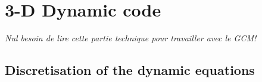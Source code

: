 \chapter{3-D Dynamic code}
\label{sc:dynamic}
{\it\bg  Nul besoin de lire cette partie technique pour travailler avec le GCM!}
\section{Discretisation of the dynamic equations}


\newcommand{\deriv}[1]{\frac{\partial }{\partial #1} }
\def\abs#1{\left| #1 \right|}
\renewcommand{\-}[1]{$^{-#1}$}

\newcommand{\dt}[1]{\frac{\partial #1}{\partial t}}
\newcommand{\dsig}[1]{\deriv{\sigma} \dep{#1} }
\newcommand{\diverg}[1]{\vec{\nabla}.\dep{#1 \vec{V}} }
\def\ps{p_s}
\def\t{\theta}
\def\w{\dot{\sigma}}
\def\cp{C_p}
\def\rcp{\kappa}

%
%

\newcommand{\adv}[1]{\diverg{\ps #1} + \dsig{\ps #1 \dot{\sigma}} }

\def\sc#1{Section~\ref{sc:#1}}
\def\an#1{Annexe~\ref{an:#1}}
\def\ch#1{Chapitre~\ref{ch:#1}}
\def\fig#1{Fig.~\ref{fg:#1}}
\def\figs#1{Figs.~\ref{fg:#1}}
\def\eq#1{Eq.~\ref{eq:#1}}
\def\eqs#1{Eqs.~\ref{eq:#1}}
\def\tb#1{Table~\ref{tb:#1}}
\def\cd{C_D}
\def\dx{\delta_X}
\def\dy{\delta_Y}
\def\dz{\delta_Z}

\def\filtre{{\cal F}}
\def\uabs{\tilde{u}_{a}}
\def\err{\epsilon}
\def\dsig{\dz \sigma}
\def\psk{{\ps}^\kappa}
\def\ucov{\tilde{u}}
\def\vcov{\tilde{v}}
\def\ucont{\tilde{\ucov}}
\def\vcont{\tilde{\vcov}}
\def\cu{c_u}
\def\cv{c_v}
\def\h{\theta}
\def\pext{\tilde{p}_s}
\def\fext{f}
\def\K{\frac{1}{2}
\left( \av{\ucov \ucont}{X} + \av{\vcov \vcont}{Y} \right)}
\def\Z{\frac{\filtre\dep{\dx \vcov - \dy \ucov} + \fext}{\av{\pext}{X,Y}}}
\def\Zm{\frac{- \dy \ucov + \fext}{\av{\pext}{Y}}}

\newcommand{\glob}[1]{ \left< #1 \right> }

